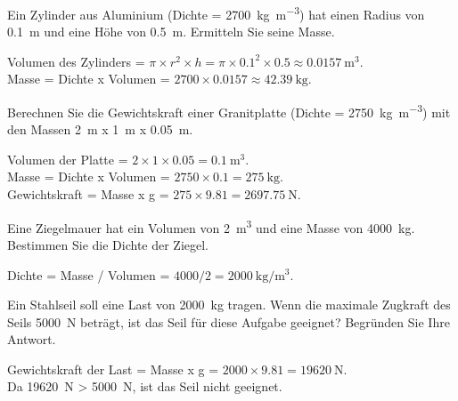 \begin{questions}
\question Ein Zylinder aus Aluminium (Dichte = \SI{2700}{\kilogram\per\cubic\meter}) hat einen Radius von \SI{0.1}{\meter} und eine Höhe von \SI{0.5}{\meter}. Ermitteln Sie seine Masse.
\begin{solution}
    Volumen des Zylinders = \(\pi \times r^2 \times h = \pi \times 0.1^2 \times 0.5 \approx \SI{0.0157}{\cubic\meter}\). \\
    Masse = Dichte x Volumen = \(2700 \times 0.0157 \approx \SI{42.39}{\kilogram}\).
\end{solution}

\question Berechnen Sie die Gewichtskraft einer Granitplatte (Dichte = \SI{2750}{\kilogram\per\cubic\meter}) mit den Massen \SI{2}{\meter} x \SI{1}{\meter} x \SI{0.05}{\meter}.
\begin{solution}
    Volumen der Platte = \(2 \times 1 \times 0.05 = \SI{0.1}{\cubic\meter}\). \\
    Masse = Dichte x Volumen = \(2750 \times 0.1 = \SI{275}{\kilogram}\). \\
    Gewichtskraft = Masse x g = \(275 \times 9.81 = \SI{2697.75}{\newton}\).
\end{solution}

\question Eine Ziegelmauer hat ein Volumen von \SI{2}{\cubic\meter} und eine Masse von \SI{4000}{\kilogram}. Bestimmen Sie die Dichte der Ziegel.
\begin{solution}
    Dichte = Masse / Volumen = \(4000 / 2 = \SI{2000}{\kilogram\per\cubic\meter}\).
\end{solution}

\question Ein Stahlseil soll eine Last von \SI{2000}{\kilogram} tragen. Wenn die maximale Zugkraft des Seils \SI{5000}{\newton} beträgt, ist das Seil für diese Aufgabe geeignet? Begründen Sie Ihre Antwort.
\begin{solution}
    Gewichtskraft der Last = Masse x g = \(2000 \times 9.81 = \SI{19620}{\newton}\). \\
    Da \SI{19620}{\newton} > \SI{5000}{\newton}, ist das Seil nicht geeignet.
\end{solution}

\end{questions}


